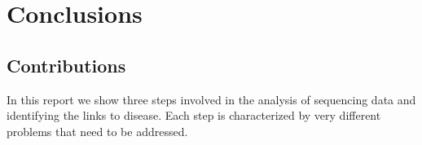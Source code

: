 
\chapter{Conclusions \label{ch:concl}}

\section{Contributions}

In this report we show three steps involved in the analysis of sequencing data and identifying the links to disease. Each step is characterized by very different problems that need to be addressed.
					
